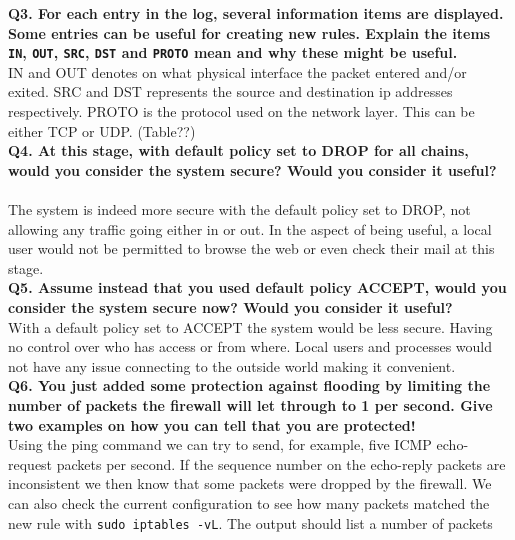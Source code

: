 \noindent \textbf{Q3. For each entry in the log, several information items are
displayed. Some entries can be useful for creating new rules. Explain the 
items \texttt{IN}, \texttt{OUT}, \texttt{SRC}, \texttt{DST} and \texttt{PROTO}
mean and why these might be useful.}
~\ \\

IN and OUT denotes on what physical interface the packet entered and/or exited. SRC and DST represents the source and destination ip addresses respectively. PROTO is the protocol used on the network layer. This can be either TCP or UDP. (Table??)
~\ \\

\noindent \textbf{Q4. At this stage, with default policy set to DROP for all 
chains, would you consider the system secure? Would you consider it useful?}
~\ \\

The system is indeed more secure with the default policy set to DROP, not allowing any traffic going either in or out. In the aspect of being useful, a local user would not be permitted to browse the web or even check their mail at this stage.
~\ \\

\noindent \textbf{Q5. Assume instead that you used default policy ACCEPT, 
would you consider the system secure now? Would you consider it useful?}
~\ \\

With a default policy set to ACCEPT the system would be less secure. Having no control over who has access or from where. Local users and processes would not have any issue connecting to the outside world making it convenient. 
~\ \\

\noindent \textbf{Q6. You just added some protection against flooding by 
limiting the number of packets the firewall will let through to 1 per second. 
Give two examples on how you can tell that you are protected!}
~\ \\

Using the ping command we can try to send, for example, five ICMP echo-request packets per second. If the sequence number on the echo-reply packets are inconsistent we then know that some packets were dropped by the firewall.
We can also check the current configuration to see how many packets matched the new rule with \texttt{sudo iptables -vL}. The output should list a number of packets
~\ \\
